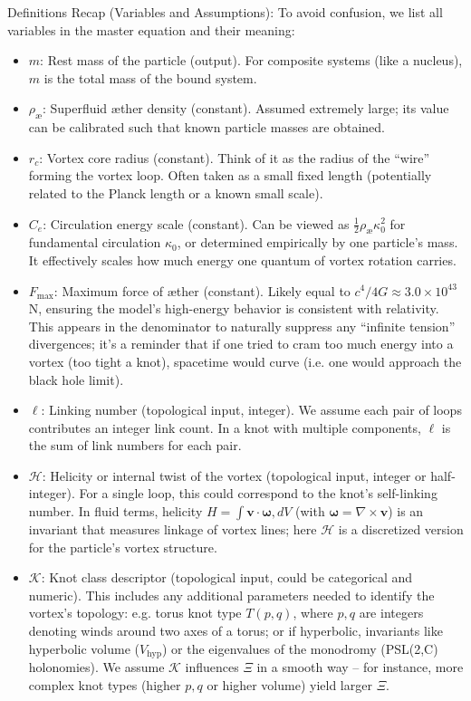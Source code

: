 Definitions Recap (Variables and Assumptions): To avoid confusion, we list all variables in the master equation and their meaning:\begin{itemize}

\item
$m$: Rest mass of the particle (output). For composite systems (like a nucleus), $m$ is the total mass of the bound system.

\item
$\rho_{\text{\ae}}$: Superfluid æther density (constant). Assumed extremely large; its value can be calibrated such that known particle masses are obtained.

\item
$r_c$: Vortex core radius (constant). Think of it as the radius of the “wire” forming the vortex loop. Often taken as a small fixed length (potentially related to the Planck length or a known small scale).

\item
$C_e$: Circulation energy scale (constant). Can be viewed as $\frac{1}{2}\rho_{\text{\ae}}\kappa_0^2$ for fundamental circulation $\kappa_0$, or determined empirically by one particle’s mass. It effectively scales how much energy one quantum of vortex rotation carries.

\item
$F_{\max}$: Maximum force of æther (constant). Likely equal to $c^4/4G \approx 3.0\times10^{43}$ N, ensuring the model’s high-energy behavior is consistent with relativity. This appears in the denominator to naturally suppress any “infinite tension” divergences; it’s a reminder that if one tried to cram too much energy into a vortex (too tight a knot), spacetime would curve (i.e. one would approach the black hole limit).

\item
$\ell$: Linking number (topological input, integer). We assume each pair of loops contributes an integer link count. In a knot with multiple components, $\ell$ is the sum of link numbers for each pair.

\item
$\mathcal{H}$: Helicity or internal twist of the vortex (topological input, integer or half-integer). For a single loop, this could correspond to the knot’s self-linking number. In fluid terms, helicity $H=\int \mathbf{v}\cdot\boldsymbol{\omega},dV$ (with $\boldsymbol{\omega}=\nabla\times\mathbf{v}$) is an invariant that measures linkage of vortex lines; here $\mathcal{H}$ is a discretized version for the particle’s vortex structure.

\item
$\mathcal{K}$: Knot class descriptor (topological input, could be categorical and numeric). This includes any additional parameters needed to identify the vortex’s topology: e.g. torus knot type $T(p,q)$, where $p,q$ are integers denoting winds around two axes of a torus; or if hyperbolic, invariants like hyperbolic volume ($V_{\text{hyp}}$) or the eigenvalues of the monodromy (PSL(2,C) holonomies). We assume $\mathcal{K}$ influences $\Xi$ in a smooth way – for instance, more complex knot types (higher $p,q$ or higher volume) yield larger $\Xi$.

\end{itemize}

